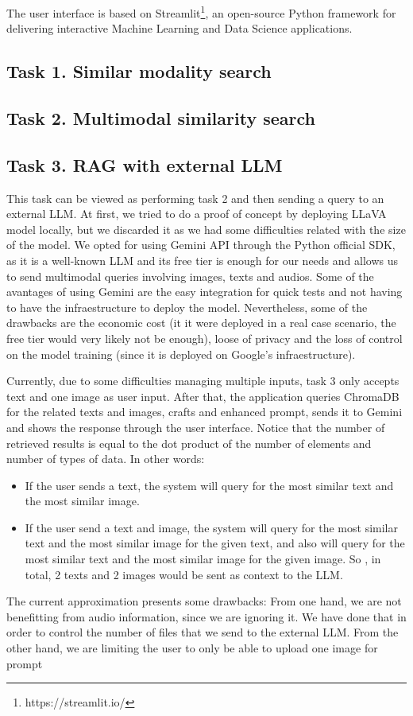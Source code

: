 \documentclass[12pt]{article}
\begin{document}
The user interface is based on Streamlit\footnote{https://streamlit.io/}, an open-source Python framework for delivering interactive Machine Learning and Data Science applications. 

\subsection{Task 1. Similar modality search}
\subsection{Task 2. Multimodal similarity search}
\subsection{Task 3. RAG with external LLM}
This task can be viewed as performing task 2 and then sending a query to an external LLM. At first, we tried to do a proof of concept by deploying LLaVA model locally, but we discarded it as we had some difficulties related with the size of the model. We opted for using Gemini API through the Python official SDK, as it is a well-known LLM and its free tier is enough for our needs and allows us to send multimodal queries involving images, texts and audios. Some of the avantages of using Gemini are the easy integration for quick tests and not having to have the infraestructure to deploy the model. Nevertheless, some of the drawbacks are the economic cost (it it were deployed in a real case scenario, the free tier would very likely not be enough), loose of privacy and the loss of control on the model training (since it is deployed on Google's infraestructure).

Currently, due to some difficulties managing multiple inputs, task 3 only accepts text and one image as user input. After that, the application queries ChromaDB for the related texts and images, crafts and enhanced prompt, sends it to Gemini and shows the response through the user interface. Notice that the number of retrieved results is equal to the dot product of the number of elements and number of types of data. In other words:
\begin{itemize}
    \item If the user sends a text, the system will query for the most similar text and the most similar image.
    \item If the user send a text and image, the system will query for the most similar text and the most similar image for the given text, and also will query for the most similar text and the most similar image for the given image. So , in total, 2 texts and 2 images would be sent as context to the LLM.
\end{itemize}

The current approximation presents some drawbacks: From one hand, we are not benefitting from audio information, since we are ignoring it. We have done that in order to control the number of files that we send to the external LLM. From the other hand, we are limiting the user to only be able to upload one image for prompt  
\end{document}
